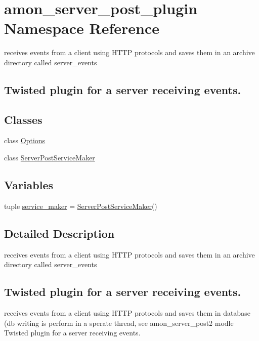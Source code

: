 \hypertarget{namespaceamon__server__post__plugin}{\section{amon\-\_\-server\-\_\-post\-\_\-plugin Namespace Reference}
\label{namespaceamon__server__post__plugin}
}


receives events from a client using H\-T\-T\-P protocols and saves them in an archive directory called server\-\_\-events \subsection*{Twisted plugin for a server receiving events.} 


\subsection*{Classes}
\begin{DoxyCompactItemize}
\item 
class \hyperlink{classamon__server__post__plugin_1_1_options}{Options}
\item 
class \hyperlink{classamon__server__post__plugin_1_1_server_post_service_maker}{Server\-Post\-Service\-Maker}
\end{DoxyCompactItemize}
\subsection*{Variables}
\begin{DoxyCompactItemize}
\item 
tuple \hyperlink{namespaceamon__server__post__plugin_a160c925c1d06e7c9ae70e1359c0f6cbe}{service\-\_\-maker} = \hyperlink{classamon__server__post__plugin_1_1_server_post_service_maker}{Server\-Post\-Service\-Maker}()
\end{DoxyCompactItemize}


\subsection{Detailed Description}
receives events from a client using H\-T\-T\-P protocols and saves them in an archive directory called server\-\_\-events \subsection*{Twisted plugin for a server receiving events.}receives events from a client using H\-T\-T\-P protocols and saves them in database (db writing is perform in a sperate thread, see amon\-\_\-server\-\_\-post2 modle Twisted plugin for a server receiving events.

